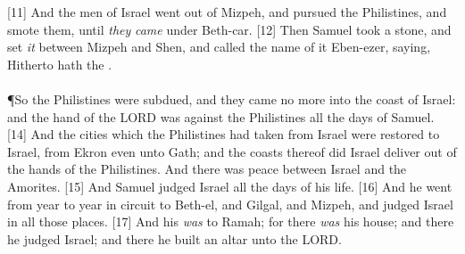 [11] \textcolor[cmyk]{0.99998,1,0,0}{And the men of Israel went out of Mizpeh, and pursued the Philistines, and smote them, until \emph{they} \emph{came} under Beth-car.}
[12] \textcolor[cmyk]{0.99998,1,0,0}{Then Samuel took a stone, and set \emph{it} between Mizpeh and Shen, and called the name of it Eben-ezer, saying, Hitherto hath the .}\\
\\
\P \textcolor[cmyk]{0.99998,1,0,0}{So the Philistines were subdued, and they came no more into the coast of Israel: and the hand of the LORD was against the Philistines all the days of Samuel.}
[14] \textcolor[cmyk]{0.99998,1,0,0}{And the cities which the Philistines had taken from Israel were restored to Israel, from Ekron even unto Gath; and the coasts thereof did Israel deliver out of the hands of the Philistines. And there was peace between Israel and the Amorites.}
[15] \textcolor[cmyk]{0.99998,1,0,0}{And Samuel judged Israel all the days of his life.}
[16] \textcolor[cmyk]{0.99998,1,0,0}{And he went from year to year in circuit to Beth-el, and Gilgal, and Mizpeh, and judged Israel in all those places.}
[17] \textcolor[cmyk]{0.99998,1,0,0}{And his  \emph{was} to Ramah; for there \emph{was} his house; and there he judged Israel; and there he built an altar unto the LORD.}